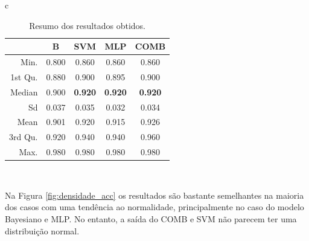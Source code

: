 \documentclass[12pt]{article}
\begin{document}
 
 
\begin{table}[!h]
\renewcommand{\arraystretch}{1.3}
\caption{Resumo dos resultados obtidos.}
\label{tab:analisis_data}
\centering
\begin{tabular}{c}
\begin{tabular}{rcccc}
\hline
         &B   &     SVM  &  MLP   &  COMB     \\
\hline     
 Min.    &0.800   &0.860   &0.860   &0.860\\  
 1st Qu. &0.880   &0.900   &0.895   &0.900\\  
 Median  &0.900   &\textbf{0.920}   &\textbf{0.920}   &\textbf{0.920}\\  
 Sd      &0.037   &0.035   &0.032   &0.034\\
 Mean    &0.901   &0.920   &0.915   &0.926\\  
 3rd Qu. &0.920   &0.940   &0.940   &0.960\\  
 Max.    &0.980   &0.980   &0.980   &0.980\\  
\hline 
\end{tabular}\\
\end{tabular}
\end{table} 
 
Na Figura \ref{fig:densidade_acc} os resultados são bastante semelhantes na maioria dos casos com uma tendência ao normalidade, principalmente no caso do modelo Bayesiano e MLP. No entanto, a saída do COMB e SVM não parecem ter uma distribuição normal.
\end{document}
